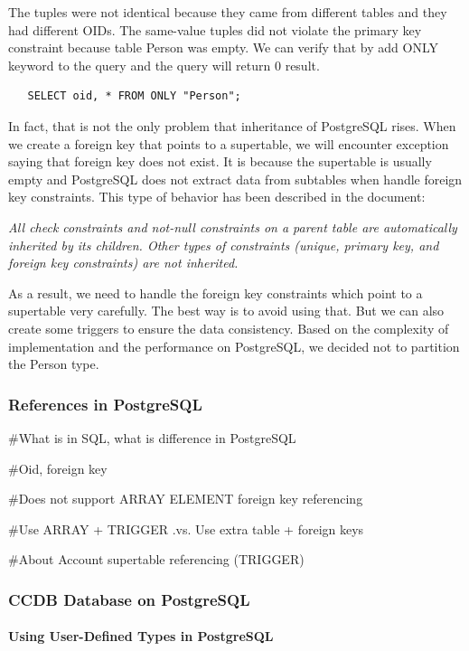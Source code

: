 \documentclass[11pt]{article}
\begin{document}
\par
The tuples were not identical because they came from different tables and they had different OIDs. The same-value tuples did not violate the primary key constraint because table Person was empty. We can verify that by add ONLY keyword to the query and the query will return 0 result.
\begin{verbatim}
   SELECT oid, * FROM ONLY "Person";
\end{verbatim}

\par
In fact, that is not the only problem that inheritance of PostgreSQL rises. When we create a foreign key that points to a supertable, we will encounter exception saying that foreign key does not exist. It is because the supertable is usually empty and PostgreSQL does not extract data from subtables when handle foreign key constraints. This type of behavior has been described in the document:
\par
\emph{All check constraints and not-null constraints on a parent table are automatically inherited by its children. Other types of constraints (unique, primary key, and foreign key constraints) are not inherited.}
\par
As a result, we need to handle the foreign key constraints which point to a supertable very carefully. The best way is to avoid using that. But we can also create some triggers to ensure the data consistency. Based on the complexity of implementation and the performance on PostgreSQL, we decided not to partition the Person type.

\subsubsection{References in PostgreSQL}
\par
\#What is in SQL, what is difference in PostgreSQL
\par
\#Oid, foreign key
\par
\#Does not support ARRAY ELEMENT foreign key referencing
\par
\#Use ARRAY + TRIGGER .vs. Use extra table + foreign keys
\par
\#About Account supertable referencing (TRIGGER)

\subsubsection{CCDB Database on PostgreSQL}

\paragraph{Using User-Defined Types in PostgreSQL}
\end{document}
